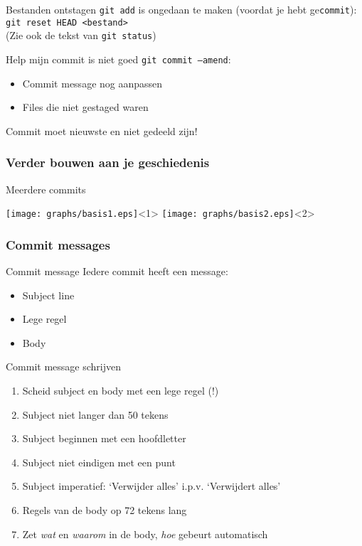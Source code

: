 \begin{frame}{Bestanden ontstagen}
	\texttt{git add} is ongedaan te maken (voordat je hebt ge\texttt{commit}):\\
	\texttt{git reset HEAD <bestand>}\\
	(Zie ook de tekst van \texttt{git status})
\end{frame}

\begin{frame}{Help mijn commit is niet goed}
	\texttt{git commit --amend}:
	\begin{itemize}
		\item Commit message nog aanpassen
		\item Files die niet gestaged waren
	\end{itemize}
	\alert{Commit moet nieuwste en niet gedeeld zijn!}
\end{frame}

\subsubsection{Verder bouwen aan je geschiedenis}
\begin{frame}{Meerdere commits}
	\begin{center}
		\texttt{[image: graphs/basis1.eps]}<1>
		\texttt{[image: graphs/basis2.eps]}<2>
	\end{center}
\end{frame}

\subsubsection{Commit messages}
\begin{frame}{Commit message}
	Iedere commit heeft een message:
	\begin{itemize}
		\item Subject line
		\item Lege regel
		\item Body
	\end{itemize}
\end{frame}

\begin{frame}{Commit message schrijven}
	\begin{enumerate}
		\item Scheid subject en body met een lege regel (!)
		\item Subject niet langer dan 50 tekens
		\item Subject beginnen met een hoofdletter
		\item Subject niet eindigen met een punt
		\item Subject imperatief: `Verwijder alles' i.p.v. `Verwijdert alles'
		\item Regels van de body op 72 tekens lang
		\item Zet \emph{wat} en \emph{waarom} in de body, \emph{hoe} gebeurt automatisch
	\end{enumerate}
\end{frame}

